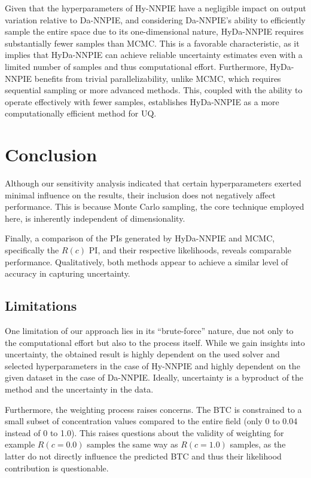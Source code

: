Given that the hyperparameters of Hy-NNPIE have a negligible impact on output variation relative to Da-NNPIE, and considering Da-NNPIE's ability to efficiently sample the entire space due to its one-dimensional nature, HyDa-NNPIE requires substantially fewer samples than MCMC. This is a favorable characteristic, as it implies that HyDa-NNPIE can achieve reliable uncertainty estimates even with a limited number of samples and thus computational effort. Furthermore, HyDa-NNPIE benefits from trivial parallelizability, unlike MCMC, which requires sequential sampling or more advanced methods. This, coupled with the ability to operate effectively with fewer samples, establishes HyDa-NNPIE as a more computationally efficient method for UQ.



\chapter{Conclusion}
\label{sec:conclusion}
Although our sensitivity analysis indicated that certain hyperparameters exerted minimal influence on the results, their inclusion does not negatively affect performance. This is because Monte Carlo sampling, the core technique employed here, is inherently independent of dimensionality.

Finally, a comparison of the PIs generated by HyDa-NNPIE and MCMC, specifically the $R(c)$ PI, and their respective likelihoods, reveals comparable performance. Qualitatively, both methods appear to achieve a similar level of accuracy in capturing uncertainty.


\section{Limitations}
One limitation of our approach lies in its ``brute-force'' nature, due not only to the computational effort but also to the process itself. While we gain insights into uncertainty, the obtained result is highly dependent on the used solver and selected hyperparameters in the case of Hy-NNPIE and highly dependent on the given dataset in the case of Da-NNPIE. Ideally, uncertainty is a byproduct of the method and the uncertainty in the data.

Furthermore, the weighting process raises concerns. The BTC is constrained to a small subset of concentration values compared to the entire field (only 0 to 0.04 instead of 0 to 1.0). This raises questions about the validity of weighting for example $R(c=0.0)$ samples the same way as $R(c=1.0)$ samples, as the latter do not directly influence the predicted BTC and thus their likelihood contribution is questionable.

